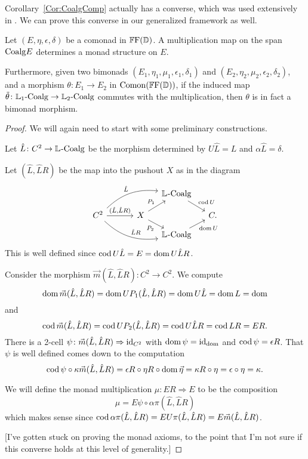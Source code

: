 Corollary~\ref{Cor:CoalgComp} actually has a converse, which was used extensively in \cite{riehl:nwfs-model}. We can prove this converse in our generalized framework as well.

\begin{proposition}
	Let $(E,\eta,\epsilon,\delta)$ be a comonad in $\FFD$. A multiplication map on the span $\Coalg E$ determines a monad structure on $E$. 

	Furthermore, given two bimonads $(E_1,\eta_1,\mu_1,\epsilon_1,\delta_1)$ and $(E_2,\eta_2,\mu_2,\epsilon_2,\delta_2)$, and a morphism $\theta\colon E_1\to E_2$ in $\Comon(\FFD)$, if the induced map $\tilde{\theta}\colon\LCoalg[1]\to\LCoalg[2]$ commutes with the multiplication, then $\theta$ is in fact a bimonad morphism.
\end{proposition}
\begin{proof}
	We will again need to start with some preliminary constructions.

	Let $\hat{L}\colon C^2\to\LCoalg$ be the morphism determined by $U\hat{L}=L$ and $\alpha\hat{L}=\delta$.

	Let $(\hat{L},\hat{L}R)$ be the map into the pushout $X$ as in the diagram
	\[
	\begin{tikzcd}[row sep=small,column sep=small,bend angle=25]
		{} &[2em]& \LCoalg \drar{\cod U} & \\
		C^2 \ar[bend left]{urr}{\hat{L}}
			\rar{(\hat{L},\hat{L}R)}
			\ar[bend right]{drr}{\hat{L}R}
		& X \urar{P_1} \drar[swap]{P_2}
		&& C. \\
		&& \LCoalg \urar[swap]{\dom U} &
	\end{tikzcd}
	\]
	This is well defined since $\cod U\hat{L}=E=\dom U\hat{L}R$.

	Consider the morphism $\vec{m}(\hat{L},\hat{L}R)\colon C^2\to C^2$. We compute
	\[
		\dom\vec{m}(\hat{L},\hat{L}R) = \dom UP_1(\hat{L},\hat{L}R) = \dom U\hat{L} = \dom L = \dom
	\]
	and
	\[
		\cod\vec{m}(\hat{L},\hat{L}R) = \cod UP_2(\hat{L},\hat{L}R) = \cod U\hat{L}R = \cod LR = ER.
	\]
	There is a 2-cell $\psi\colon\vec{m}(\hat{L},\hat{L}R)\Rightarrow\id_{C^2}$ with $\dom\psi=\id_{\dom}$ and $\cod\psi=\epsilon R$. That $\psi$ is well defined comes down to the computation
	\[
		\cod\psi \circ \kappa\vec{m}(\hat{L},\hat{L}R) = \epsilon R \circ \eta R \circ \dom\vec{\eta} = \kappa R \circ \eta = \epsilon\circ\eta = \kappa.
	\]

	We will define the monad multiplication $\mu\colon ER\Rightarrow E$ to be the composition
	\[
		\mu = E\psi \circ \alpha\pi(\hat{L},\hat{L}R)
	\]
	which makes sense since $\cod\alpha\pi(\hat{L},\hat{L}R) = EU\pi(\hat{L},\hat{L}R)=E\vec{m}(\hat{L},\hat{L}R)$.

	[I've gotten stuck on proving the monad axioms, to the point that I'm not sure if this converse holds at this level of generality.]
\end{proof}